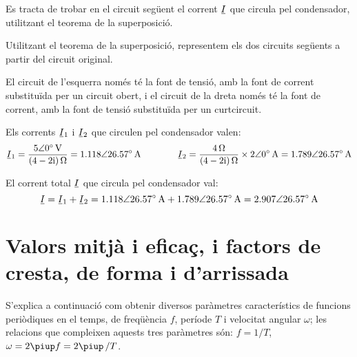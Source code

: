 \begin{exemple}\label{ex:Superposicio}
	\addcontentsxms{\Superposicio}
    Es tracta de trobar en el circuit següent el corrent $\cmplx{I}$ que circula
    pel condensador, utilitzant el teorema de la superposició.
    \begin{center}
        
    \end{center}

    Utilitzant el teorema de la superposició, representem els dos
    circuits següents a partir del circuit original. 
    
    El circuit de
    l'esquerra només té la font de tensió, amb la font de corrent substituïda per un circuit obert, i el circuit de
    la dreta només té la font de corrent, amb la font de tensió
    substituïda per un curtcircuit.
    
    \begin{center}
        
    \end{center}

    Els corrents $\cmplx{I}_1$ i $\cmplx{I}_2$ que circulen pel condensador valen:
    \[
        \cmplx{I}_1 = \frac{\complexqty{5:0}{V}}{\complexqty{4-2j}{\ohm}} =
        \complexqty{1,118:26,57}{A} \qquad\qquad
        \cmplx{I}_2 = \frac{\qty{4}{\ohm}}{\complexqty{4-2j}{ \ohm}} \times \complexqty{2:0}{A} = \complexqty{1,789:26,57}{A}
    \]

    El corrent total $\cmplx{I}$ que circula pel condensador val:
    \[
        \cmplx{I}  = \cmplx{I}_1 + \cmplx{I}_2 = \complexqty{1,118:26,57}{A} +  \complexqty{1,789:26,57}{A} =
        \complexqty{2,907:26,57}{A}
    \]
\end{exemple}



\section{Valors mitjà i eficaç, i factors de cresta, de forma i d'arrissada}\label{sec:val_mitja_ef}

S'explica a continuació com obtenir diversos paràmetres característics de funcions periòdiques  en el temps, de freqüència $f$, període $T$ i velocitat angular $\omega$; les relacions que compleixen aquests tres paràmetres són: $f = 1/T$, $\omega=2\piup f = 2\piup\,/T$.

